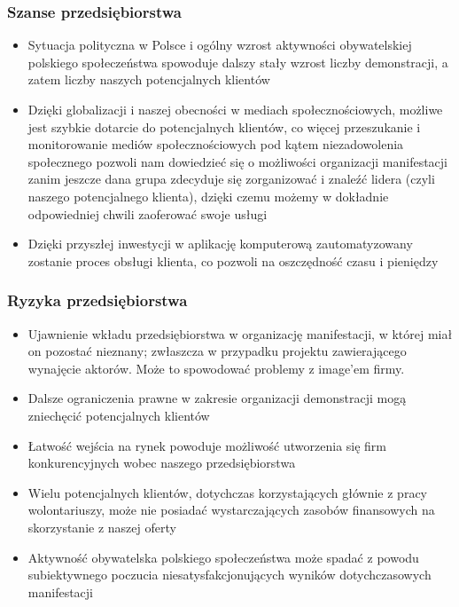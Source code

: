 \documentclass{article}
\begin{document}
\subsubsection{Szanse przedsiębiorstwa}
\begin{itemize}
\item Sytuacja polityczna w Polsce i ogólny wzrost aktywności obywatelskiej polskiego społeczeństwa spowoduje dalszy stały wzrost liczby demonstracji, a zatem liczby naszych potencjalnych klientów
\item Dzięki globalizacji i naszej obecności w mediach społecznościowych, możliwe jest szybkie dotarcie do potencjalnych klientów, co więcej przeszukanie i monitorowanie mediów społecznościowych pod kątem niezadowolenia społecznego pozwoli nam dowiedzieć się o możliwości organizacji manifestacji zanim jeszcze dana grupa zdecyduje się zorganizować i znaleźć lidera (czyli naszego potencjalnego klienta), dzięki czemu możemy w dokładnie odpowiedniej chwili zaoferować swoje usługi
\item Dzięki przyszłej inwestycji w aplikację komputerową zautomatyzowany zostanie proces obsługi klienta, co pozwoli na oszczędność czasu i pieniędzy
\end{itemize}
\subsubsection{Ryzyka przedsiębiorstwa}
\begin{itemize}
\item Ujawnienie wkładu przedsiębiorstwa w organizację manifestacji, w której miał on pozostać nieznany; zwłaszcza w przypadku projektu zawierającego wynajęcie aktorów. Może to spowodować problemy z image'em firmy.
\item Dalsze ograniczenia prawne w zakresie organizacji demonstracji mogą zniechęcić potencjalnych klientów
\item Łatwość wejścia na rynek powoduje możliwość utworzenia się firm konkurencyjnych wobec naszego przedsiębiorstwa
\item Wielu potencjalnych klientów, dotychczas korzystających głównie z pracy wolontariuszy, może nie posiadać wystarczających zasobów finansowych na skorzystanie z naszej oferty
\item Aktywność obywatelska polskiego społeczeństwa może spadać z powodu subiektywnego poczucia niesatysfakcjonujących wyników dotychczasowych manifestacji
\end{itemize}
\end{document}
